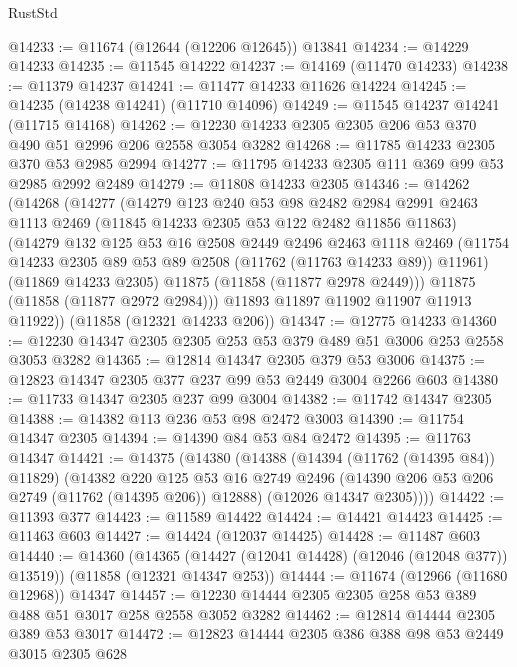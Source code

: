 \begin{lexlean}{RustStd}
\begin{coremodule}
@14233 := @11674 (@12644 (@12206 @12645)) @13841
@14234 := @14229 @14233
@14235 := @11545 @14222
@14237 := @14169 (@11470 @14233)
@14238 := @11379 @14237
@14241 := @11477 @14233 @11626 @14224
@14245 := @14235 (@14238 @14241) (@11710 @14096)
@14249 := @11545 @14237 @14241 (@11715 @14168)
@14262 := @12230 @14233 @2305 @2305 @206 @53 @370 @490 @51 @2996 @206 @2558 @3054 @3282
@14268 := @11785 @14233 @2305 @370 @53 @2985 @2994
@14277 := @11795 @14233 @2305 @111 @369 @99 @53 @2985 @2992 @2489
@14279 := @11808 @14233 @2305
@14346 := @14262
    (@14268
      (@14277
        (@14279
          @123
          @240
          @53
          @98
          @2482
          @2984
          @2991
          @2463
          @1113
          @2469
          (@11845 @14233 @2305 @53 @122 @2482 @11856 @11863)
          (@14279
            @132
            @125
            @53
            @16
            @2508
            @2449
            @2496
            @2463
            @1118
            @2469
            (@11754 @14233 @2305 @89 @53 @89 @2508 (@11762 (@11763 @14233 @89)) @11961)
            (@11869 @14233 @2305)
            @11875
            (@11858 (@11877 @2978 @2449)))
          @11875
          (@11858 (@11877 @2972 @2984)))
        @11893
        @11897
        @11902
        @11907
        @11913
        @11922))
    (@11858 (@12321 @14233 @206))
@14347 := @12775 @14233
@14360 := @12230 @14347 @2305 @2305 @253 @53 @379 @489 @51 @3006 @253 @2558 @3053 @3282
@14365 := @12814 @14347 @2305 @379 @53 @3006
@14375 := @12823 @14347 @2305 @377 @237 @99 @53 @2449 @3004 @2266 @603
@14380 := @11733 @14347 @2305 @237 @99 @3004
@14382 := @11742 @14347 @2305
@14388 := @14382 @113 @236 @53 @98 @2472 @3003
@14390 := @11754 @14347 @2305
@14394 := @14390 @84 @53 @84 @2472
@14395 := @11763 @14347
@14421 := @14375
    (@14380
      (@14388
        (@14394 (@11762 (@14395 @84)) @11829)
        (@14382
          @220
          @125
          @53
          @16
          @2749
          @2496
          (@14390 @206 @53 @206 @2749 (@11762 (@14395 @206)) @12888)
          (@12026 @14347 @2305))))
@14422 := @11393 @377
@14423 := @11589 @14422
@14424 := @14421 @14423
@14425 := @11463 @603
@14427 := @14424 (@12037 @14425)
@14428 := @11487 @603
@14440 := @14360
    (@14365 (@14427 (@12041 @14428) (@12046 (@12048 @377)) @13519))
    (@11858 (@12321 @14347 @253))
@14444 := @11674 (@12966 (@11680 @12968)) @14347
@14457 := @12230 @14444 @2305 @2305 @258 @53 @389 @488 @51 @3017 @258 @2558 @3052 @3282
@14462 := @12814 @14444 @2305 @389 @53 @3017
@14472 := @12823 @14444 @2305 @386 @388 @98 @53 @2449 @3015 @2305 @628

\end{coremodule}
\end{lexlean}
